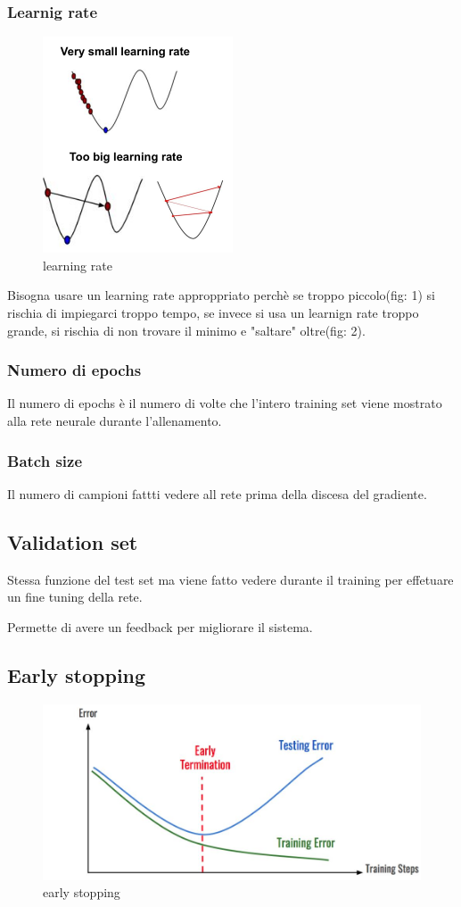 \subsubsection{Learnig rate}
\begin{figure}[H]
    \centering
    \includegraphics[width=0.3\linewidth]{imgs/learning-rate}
    \caption{learning rate}
    \label{fig:learning_rate}
\end{figure}

Bisogna usare un learning rate approppriato perchè se troppo piccolo(fig: 1)
si rischia di impiegarci troppo tempo, se invece si usa un learnign rate troppo
grande, si rischia di non trovare il minimo e "saltare" oltre(fig: 2).

\subsubsection{Numero di epochs}
Il numero di epochs è il numero di volte che l'intero training set viene mostrato
alla rete neurale durante l'allenamento.

\subsubsection{Batch size}
Il numero di campioni fattti vedere all rete prima della discesa del gradiente.

\subsection{Validation set}
Stessa funzione del test set ma viene fatto vedere durante il training
per effetuare un fine tuning della rete.

Permette di avere un feedback per migliorare il sistema.

\subsection{Early stopping}


\begin{figure}[H]
    \centering
    \includegraphics[width=0.5\linewidth]{imgs/early-stopping}
    \caption{early stopping}
    \label{fig:early_stopping}
\end{figure}

